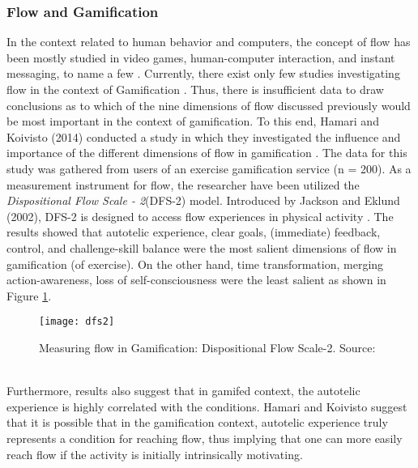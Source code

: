 \subsubsection{Flow and Gamification}
In the context related to human behavior and computers, the concept of flow has been mostly studied in video games, human-computer interaction, and instant messaging, to name a few \cite{hamari2014measuring}. Currently, there exist only few studies investigating flow in the context of Gamification \cite{hamari2014measuring, sillaots2014achieving}. Thus, there is insufficient data to draw conclusions as to which of the nine dimensions of flow discussed previously would be most important in the context of gamification. To this end, Hamari and Koivisto (2014) conducted a study in which they investigated the influence and importance of the different dimensions of flow in gamification \cite{hamari2014measuring}. The data for this study was gathered from users of an exercise gamification service (n = 200). As a measurement instrument for flow, the researcher have been utilized the \textit{Dispositional Flow Scale - 2}(DFS-2) model. Introduced by Jackson and Eklund (2002), DFS-2 is designed to access flow experiences in physical activity \cite{jackson2002assessing}. The results showed that autotelic experience, clear goals, (immediate) feedback, control, and challenge-skill balance were the most salient dimensions of flow in gamification (of exercise). On the other hand, time transformation, merging action-awareness, loss of self-consciousness were the least salient as shown in Figure \ref{fig:dfs2}.\\
\begin{figure}[h]
    \centering
    \texttt{[image: dfs2]}
    \caption{Measuring flow in Gamification: Dispositional Flow Scale-2. Source:  \cite{dfs2}}
    \label{fig:dfs2}
\end{figure}\\
Furthermore, results also suggest that in gamifed context, the autotelic experience is highly correlated with the conditions. Hamari and Koivisto suggest that it is possible that in the gamification context, autotelic experience truly represents a condition for reaching flow, thus implying that one can more easily reach flow if the activity is initially intrinsically motivating. 
